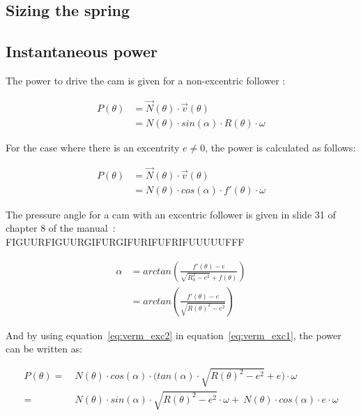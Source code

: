 \documentclass[a4paper]{article}
\begin{document}
\subsection{Sizing the spring}

\subsection{Instantaneous power}

The power to drive the cam is given for a non-excentric follower \cite{vermogen}:

\begin{equation}
	\begin{split}
	P(\theta) & = \vec{N}(\theta)\cdot\vec{v}(\theta) \\
	&=N(\theta)\cdot sin(\alpha)\cdot R(\theta)\cdot \omega
	\end{split}
\end{equation}

For the case where there is an excentrity \(e\neq0\), the power is calculated as follows:

\begin{equation}
	\begin{split}
	P(\theta) & = \vec{N}(\theta)\cdot\vec{v}(\theta) \\
	&=N(\theta)\cdot cos(\alpha)\cdot f'(\theta)\cdot\omega
	\end{split}
	\label{eq:verm_exc1}
\end{equation}

The pressure angle for a cam with an excentric follower is given in slide 31 of chapter 8 of the manual~\cite{cursus}: FIGUURFIGUURGIFURGIFURIFUFRIFUUUUUFFF

\begin{equation}
	\begin{split}
	\alpha& = arctan\left(\frac{f'(\theta)-e}{\sqrt{R_0^2-e^2}+f(\theta)}\right)\\
	&=arctan\left(\frac{f'(\theta)-e}{\sqrt{R(\theta)^2-e^2}}\right)
	\end{split}
	\label{eq:verm_exc2}
\end{equation}

And by using equation~\ref{eq:verm_exc2} in equation~\ref{eq:verm_exc1}, the power can be written as:

\begin{equation}
	\begin{split}
	P(\theta) =&~ N(\theta)\cdot cos(\alpha)\cdot \Big(tan(\alpha)\cdot\sqrt{R(\theta)^2-e^2}+e\Big)\cdot\omega\\
	=&~N(\theta)\cdot sin(\alpha)\cdot\sqrt{R(\theta)^2-e^2}\cdot\omega  +~N(\theta)\cdot cos(\alpha)\cdot e \cdot\omega
	\end{split}
\end{equation}
\end{document}
